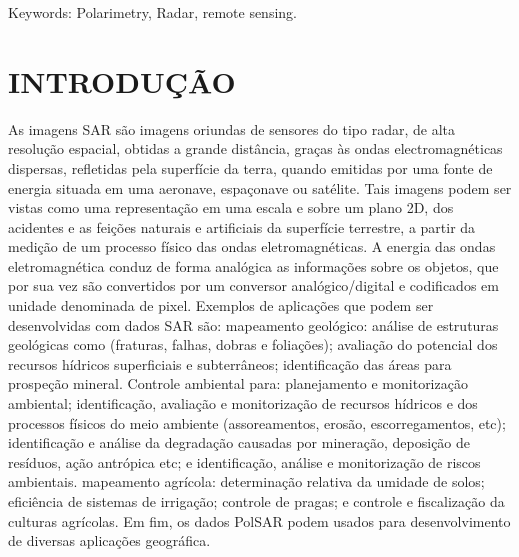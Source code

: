\documentclass[a4paper,12pt]{article}
\begin{document}
Keywords: Polarimetry, Radar, remote sensing.
\newpage
\section{INTRODUÇÃO}
\label{Int}

As imagens SAR são imagens oriundas de sensores do tipo radar, de alta resolução espacial, obtidas a grande distância, graças às ondas electromagnéticas dispersas, refletidas pela superfície da terra, quando emitidas por uma fonte de energia situada em uma aeronave, espaçonave ou satélite. Tais imagens podem ser vistas como uma representação em uma escala e sobre um plano 2D, dos acidentes e as feições naturais e artificiais da superfície terrestre, a partir da medição de um processo físico das ondas eletromagnéticas. A energia das ondas eletromagnética conduz de forma analógica as informações sobre os objetos, que por sua vez são convertidos por um conversor analógico/digital e codificados em unidade denominada de pixel. Exemplos de aplicações que podem ser desenvolvidas com dados SAR são: mapeamento geológico: análise de estruturas geológicas como (fraturas, falhas, dobras e foliações); avaliação do potencial dos recursos hídricos superficiais e subterrâneos;  identificação das áreas para prospeção mineral. Controle ambiental para: planejamento e monitorização ambiental; identificação, avaliação e monitorização de recursos hídricos e dos processos físicos do meio ambiente (assoreamentos, erosão, escorregamentos, etc); identificação e análise da degradação causadas por mineração, deposição de resíduos, ação antrópica etc; e identificação, análise e monitorização de riscos ambientais. mapeamento agrícola: determinação relativa da umidade de solos; eficiência de sistemas de irrigação; controle de pragas; e controle e fiscalização da culturas agrícolas. Em fim, os dados PolSAR podem usados para desenvolvimento de diversas aplicações geográfica.\\
\end{document}
